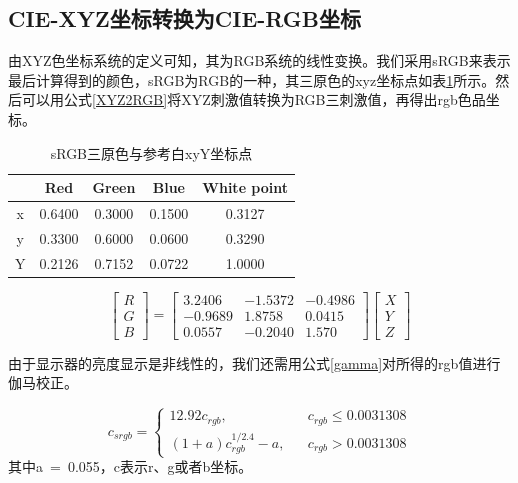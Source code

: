 \subsection{CIE-XYZ坐标转换为CIE-RGB坐标}
由XYZ色坐标系统的定义可知，其为RGB系统的线性变换。我们采用sRGB来表示最后计算得到的颜色，sRGB为RGB的一种，其三原色的xyz坐标点如表\ref{sRGBxyz}所示。然后可以用公式\ref{XYZ2RGB}\cite{international1999iec}将XYZ刺激值转换为RGB三刺激值，再得出rgb色品坐标。
\begin{table}[htb]
	\captionsetup{justification=centering}
	\caption{sRGB三原色与参考白xyY坐标点}
	\label{sRGBxyz}
	\centering
	\begin{tabular}[t]{|ccccc|}
		\hline
		& Red & Green & Blue & White point \\
		\hline
		x & 0.6400 & 0.3000 & 0.1500 & 0.3127 \\
		\hline
		y	& 0.3300 & 0.6000 & 0.0600 & 0.3290 \\
		\hline
		Y	& 0.2126 & 0.7152 & 0.0722 & 1.0000 \\
		\hline
	\end{tabular}
\end{table}

\begin{equation}
\label{XYZ2RGB}
\left[\begin{array}{c}
R\\
G\\
B
\end{array}
\right]=
\begin{bmatrix}
3.2406 & -1.5372 & -0.4986\\
-0.9689 & 1.8758 & 0.0415\\
0.0557 & -0.2040 & 1.570
\end{bmatrix}
\begin{bmatrix}
X\\Y\\Z
\end{bmatrix}
\end{equation}

由于显示器的亮度显示是非线性的，我们还需用公式\ref{gamma}对所得的rgb值进行伽马校正\cite{international1999iec}。

\begin{equation}
\label{gamma}
c_{srgb} = \left\{
\begin{array}{lcc}
12.92c_{rgb}, &     & c_{rgb}\le0.0031308\\
(1+a)c_{rgb}^{1/2.4}-a,&     & c_{rgb}>0.0031308
\end{array}
	\right.
\end{equation}
其中a~=~0.055，c表示r、g或者b坐标。


